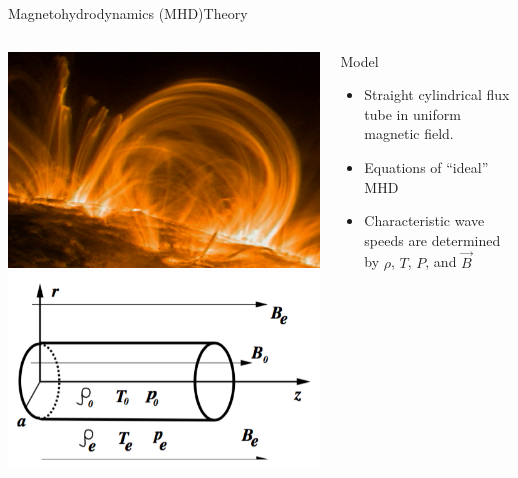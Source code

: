 \documentclass[11pt,table]{beamer}
\begin{document}
\begin{frame}{Magnetohydrodynamics (MHD)}{Theory}
    \begin{columns}
        \includegraphics[width=\textwidth]{loop.jpg}\\
        \includegraphics[width=\textwidth]{cylinder.png}
        \begin{block}{Model}
            \begin{itemize}
                \item Straight cylindrical flux tube in uniform magnetic field.
                \item Equations of ``ideal'' MHD
                \item Characteristic wave speeds are determined by
                    $\rho$, $T$, $P$, and $\vec{B}$
            \end{itemize}

\end{block}
\end{columns}
\end{frame}
\end{document}
